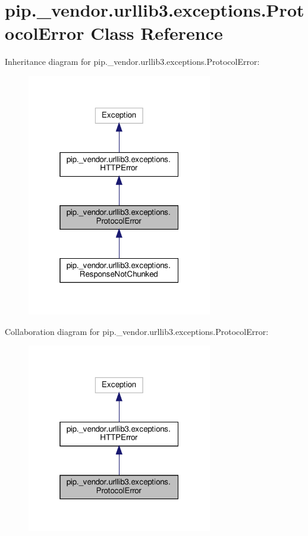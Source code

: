\hypertarget{classpip_1_1__vendor_1_1urllib3_1_1exceptions_1_1ProtocolError}{}\section{pip.\+\_\+vendor.\+urllib3.\+exceptions.\+Protocol\+Error Class Reference}
\label{classpip_1_1__vendor_1_1urllib3_1_1exceptions_1_1ProtocolError}


Inheritance diagram for pip.\+\_\+vendor.\+urllib3.\+exceptions.\+Protocol\+Error\+:
\nopagebreak
\begin{figure}[H]
\begin{center}
\leavevmode
\includegraphics[width=229pt]{classpip_1_1__vendor_1_1urllib3_1_1exceptions_1_1ProtocolError__inherit__graph}
\end{center}
\end{figure}


Collaboration diagram for pip.\+\_\+vendor.\+urllib3.\+exceptions.\+Protocol\+Error\+:
\nopagebreak
\begin{figure}[H]
\begin{center}
\leavevmode
\includegraphics[width=229pt]{classpip_1_1__vendor_1_1urllib3_1_1exceptions_1_1ProtocolError__coll__graph}
\end{center}
\end{figure}


